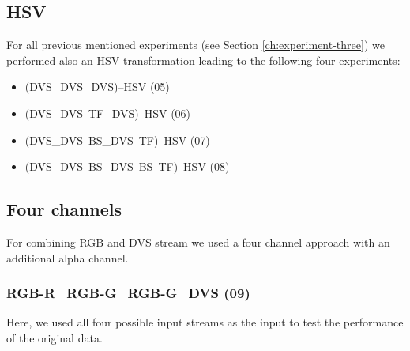 \documentclass[sigchi,screen]{acmart}
\begin{document}
\subsection{HSV}
For all previous mentioned experiments (see Section \ref{ch:experiment-three}) we performed also an HSV transformation leading to the following four experiments:
\begin{itemize}
    \item (DVS\_DVS\_DVS)--HSV (05)
    \item (DVS\_DVS--TF\_DVS)--HSV (06)
    \item (DVS\_DVS--BS\_DVS--TF)--HSV (07)
    \item (DVS\_DVS--BS\_DVS--BS--TF)--HSV (08)
\end{itemize}
\subsection{Four channels}
For combining RGB and DVS stream we used a four channel approach with an additional alpha channel.
\subsubsection{RGB-R\_RGB-G\_RGB-G\_DVS (09)}
Here, we used all four possible input streams as the input to test the performance of the original data.
\end{document}
